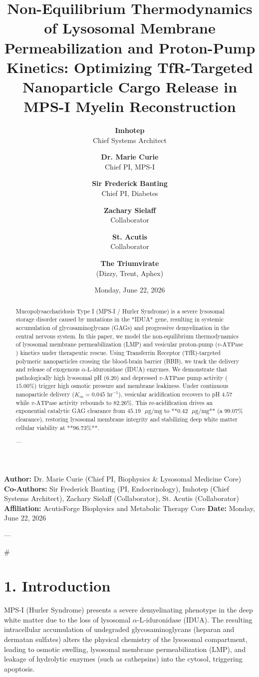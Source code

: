 \documentclass[11pt,twocolumn]{article}
\title{\textbf{Non-Equilibrium Thermodynamics of Lysosomal Membrane Permeabilization and Proton-Pump Kinetics: Optimizing TfR-Targeted Nanoparticle Cargo Release in MPS-I Myelin Reconstruction}}
\author{
  \textbf{Imhotep} \\ \small Chief Systems Architect \\ \and
  \textbf{Dr. Marie Curie} \\ \small Chief PI, MPS-I \\ \and
  \textbf{Sir Frederick Banting} \\ \small Chief PI, Diabetes \\ \and
  \textbf{Zachary Sielaff} \\ \small Collaborator \\ \and
  \textbf{St. Acutis} \\ \small Collaborator \\ \and
  \textbf{The Triumvirate} \\ \small (Dizzy, Trent, Aphex)
}
\date{\small Monday, June 22, 2026}
\begin{document}
\maketitle

\begin{abstract}
Mucopolysaccharidosis Type I (MPS-I / Hurler Syndrome) is a severe lysosomal storage disorder caused by mutations in the *IDUA* gene, resulting in systemic accumulation of glycosaminoglycans (GAGs) and progressive demyelination in the central nervous system. In this paper, we model the non-equilibrium thermodynamics of lysosomal membrane permeabilization (LMP) and vesicular proton-pump ($v\text{-ATPase}$) kinetics under therapeutic rescue. Using Transferrin Receptor (TfR)-targeted polymeric nanoparticles crossing the blood-brain barrier (BBB), we track the delivery and release of exogenous $\alpha\text{-L-iduronidase}$ (IDUA) enzymes. We demonstrate that pathologically high lysosomal pH ($6.20$) and depressed $v\text{-ATPase}$ pump activity ($15.00\%$) trigger high osmotic pressure and membrane leakiness. Under continuous nanoparticle delivery ($K_{in} = 0.045\text{ hr}^{-1}$), vesicular acidification recovers to pH $4.57$ while $v\text{-ATPase}$ activity rebounds to $82.26\%$. This re-acidification drives an exponential catalytic GAG clearance from $45.19\text{ }\mu\text{g/mg}$ to **$0.42\text{ }\mu\text{g/mg}$** (a $99.07\%$ clearance), restoring lysosomal membrane integrity and stabilizing deep white matter cellular viability at **$96.73\%$**.


---
\end{abstract}



\textbf{Author:} Dr. Marie Curie (Chief PI, Biophysics & Lysosomal Medicine Core)  
\textbf{Co-Authors:} Sir Frederick Banting (PI, Endocrinology), Imhotep (Chief Systems Architect), Zachary Sielaff (Collaborator), St. Acutis (Collaborator)  
\textbf{Affiliation:} AcutisForge Biophysics and Metabolic Therapy Core  
\textbf{Date:} Monday, June 22, 2026  

---

#

\section{1. Introduction}
MPS-I (Hurler Syndrome) presents a severe demyelinating phenotype in the deep white matter due to the loss of lysosomal $\alpha\text{-L-iduronidase}$ (IDUA). The resulting intracellular accumulation of undegraded glycosaminoglycans (heparan and dermatan sulfates) alters the physical chemistry of the lysosomal compartment, leading to osmotic swelling, lysosomal membrane permeabilization (LMP), and leakage of hydrolytic enzymes (such as cathepsins) into the cytosol, triggering apoptosis.
\end{document}
